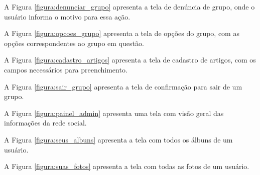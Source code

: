 
A Figura \ref{figura:denunciar_grupo} apresenta a tela de denúncia de grupo, onde o usuário informa o motivo para essa ação.


A Figura \ref{figura:opcoes_grupo} apresenta a tela de opções do grupo, com as opções correspondentes ao grupo em questão.


A Figura \ref{figura:cadastro_artigos} apresenta a tela de cadastro de artigos, com os campos necessários para preenchimento.


A Figura \ref{figura:sair_grupo} apresenta a tela de confirmação para sair de um grupo.


A Figura \ref{figura:painel_admin} apresenta uma tela com visão geral das informações da rede social.


A Figura \ref{figura:seus_albuns} apresenta a tela com todos os álbuns de um usuário.


A Figura \ref{figura:suas_fotos} apresenta a tela com todas as fotos de um usuário.


